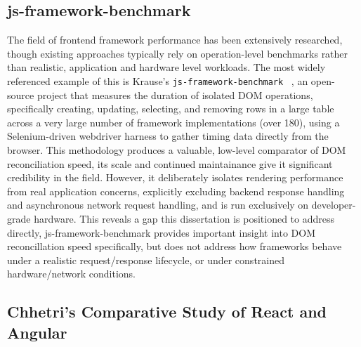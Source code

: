\documentclass[11pt,a4paper]{report}
\begin{document}
\subsection{js-framework-benchmark}

The field of frontend framework performance has been extensively researched, though existing approaches typically rely on operation-level benchmarks rather than realistic, application and hardware level workloads. The most widely referenced example of this is Krause's \texttt{js\allowbreak-framework\allowbreak-benchmark} ~\cite{krause}, an open-source project that measures the duration of isolated DOM operations, specifically creating,
updating, selecting, and removing rows in a large table across a very large number of framework implementations (over 180), using a Selenium-driven webdriver harness to gather timing data directly from the browser. This methodology produces a valuable, low-level comparator of DOM reconciliation speed, its scale and continued maintainance give it significant credibility in the field. However, it deliberately isolates rendering performance from real application concerns, explicitly excluding backend response handling and asynchronous network request handling, and is run exclusively on developer-grade hardware. This reveals a gap this dissertation is positioned to address directly, js-framework-benchmark 
provides important insight into DOM reconcillation speed specifically, but does not address how frameworks behave under a realistic request/response lifecycle, or under constrained hardware/network conditions. 

\subsection{Chhetri's Comparative Study of React and Angular}
\end{document}

